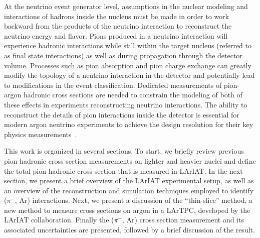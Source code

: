 \documentclass[%
 floatfix,
 reprint,
 twocolumn,
superscriptaddress,
showpacs,preprintnumbers,
 amsmath,amssymb,
 aps,
prd,
]{revtex4-1}
\begin{document}
At the neutrino event generator level, assumptions in the nuclear modeling and interactions of hadrons inside the nucleus must be made in order to work backward from the products of the neutrino interaction to reconstruct the neutrino energy and flavor. 
Pions produced in a neutrino interaction will experience hadronic interactions while still within the target nucleus (referred to as final state interactions) as well as during propagation through the detector volume.  Processes such as pion absorption and pion charge exchange can greatly modify the topology of a neutrino interaction in the detector and potentially lead to modifications in the event classification.
Dedicated measurements of pion-argon hadronic cross sections are needed to constrain the modeling of both of these effects in experiments reconstructing neutrino interactions.  %
The ability to reconstruct the details of pion interactions inside the detector is essential for modern argon neutrino experiments to achieve the design resolution for their key physics measurements~\cite{Friedland:2020cdp}. %

This work is organized in several sections. To start, we briefly review previous pion hadronic cross section measurements on lighter and heavier nuclei and define the total pion hadronic cross section that is measured in LArIAT. In the next section, we present a brief overview of the LArIAT experimental setup, as well as an overview of the reconstruction and simulation techniques employed to identify ($\pi^-$, Ar) interactions. Next, we present a discussion of the ``thin-slice'' method, a new  method to measure cross sections on argon in a LArTPC, developed by the LArIAT collaboration.  Finally the ($\pi^-$, Ar) cross section measurement and its associated uncertainties are presented, followed by a brief discussion of the result.
\end{document}
